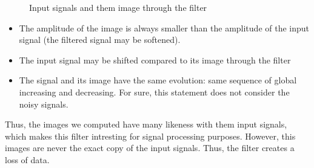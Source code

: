 \documentclass[a4paper,10pt]{article}
\begin{document}
\begin{figure}[!htb]
	  \begin{minipage}{0.45\textwidth}  \end{minipage}
	  \begin{minipage}{0.45\textwidth}  \end{minipage}
	  \caption{Input signals and them image through the filter}
	  \label{Signal_image}
	\end{figure}
	\begin{itemize}
	 \item The amplitude of the image is always smaller than the amplitude of the input signal (the filtered signal may be softened).
	 \item The input signal may be shifted compared to its image through the filter
	 \item The signal and its image have the same evolution: same sequence of global increasing and decreasing. For sure, this statement does not consider the noisy signals.
	\end{itemize}
	Thus, the images we computed have many likeness with them input signals, which makes this filter intresting for signal processing purposes.   
	However, this images are never the exact copy of the input signals.  Thus, the filter creates a loss of data.
\end{document}
